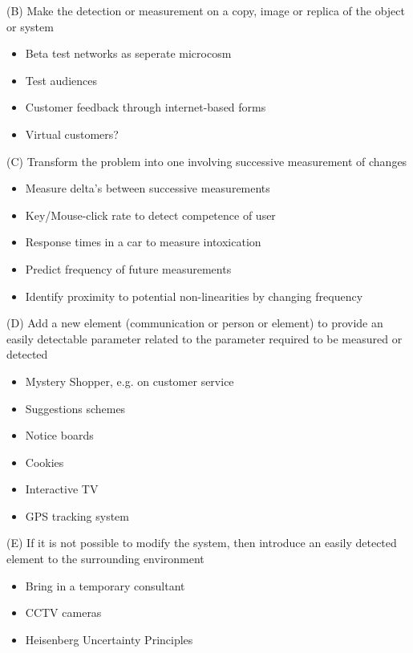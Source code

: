 \documentclass{beamer}
\begin{document}
	\begin{frame}{(B) Make the detection or measurement on a copy, image or replica of the object or system}
		\begin{itemize}
			\item Beta test networks as seperate microcosm
			\item Test audiences
			\item Customer feedback through internet-based forms
			\item Virtual customers?
		\end{itemize}
	\end{frame}

	\begin{frame}{(C) Transform the problem into one involving successive measurement of changes}
		\begin{itemize}
			\item Measure delta's between successive measurements
			\item Key/Mouse-click rate to detect competence of user
			\item Response times in a car to measure intoxication
			\item Predict frequency of future measurements
			\item Identify proximity to potential non-linearities by changing frequency
		\end{itemize}
	\end{frame}

	\begin{frame}{(D) Add a new element (communication or person or element) to provide an easily detectable parameter related to the parameter required to be measured or detected}
		\begin{itemize}
			\item Mystery Shopper, e.g. on customer service
			\item Suggestions schemes
			\item Notice boards
			\item Cookies
			\item Interactive TV
			\item GPS tracking system
		\end{itemize}
	\end{frame}

	\begin{frame}{(E) If it is not possible to modify the system, then introduce an easily detected element to the surrounding environment}
		\begin{itemize}
			\item Bring in a temporary consultant
			\item CCTV cameras
			\item Heisenberg Uncertainty Principles
		\end{itemize}
	\end{frame}
\end{document}
